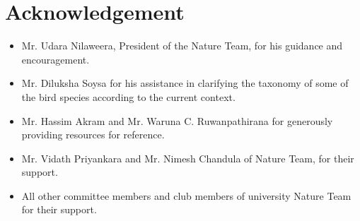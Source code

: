 \chapter{Acknowledgement}
\label{cp:Acknowledgement}
\begin{itemize}
    \item Mr. Udara Nilaweera, President of the Nature Team, for his guidance and encouragement.\\
    \item Mr. Diluksha Soysa for his assistance in clarifying the taxonomy of some of the bird species according to the current context.\\
    \item Mr. Hassim Akram and Mr. Waruna C. Ruwanpathirana for generously providing resources for reference.\\
    \item Mr. Vidath Priyankara and Mr. Nimesh Chandula of Nature Team, for their  support.
    \\
    \item All other committee members and club members of university Nature Team for their support.
\end{itemize}